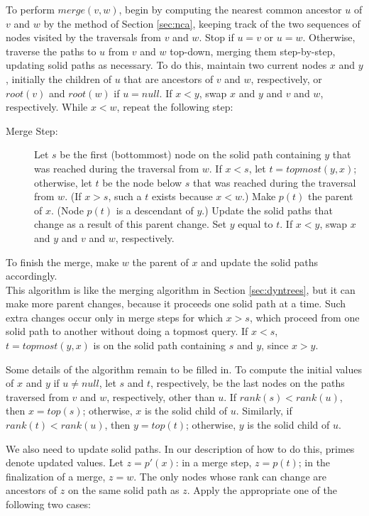 \documentclass[twoside,leqno,twocolumn]{article}
\newcommand{\rank}{\mathit{rank}}
\newcommand{\merge}{\mathit{merge}}
\newcommand{\topn}{\mathit{top}}
\newcommand{\nul}{\mathit{null}}
\newcommand{\rootn}{\mathit{root}}
\begin{document}
To perform $\merge(v, w)$, begin by computing the nearest common ancestor $u$ of $v$ and $w$ by the method of Section \ref{sec:nca}, keeping track of the two sequences of nodes visited by the traversals from $v$ and $w$. Stop if $u=v$ or $u=w$. Otherwise, traverse the paths to $u$ from $v$ and $w$ top-down, merging them step-by-step, updating solid paths as necessary. To do this, maintain two current nodes $x$ and $y$, initially the children of $u$ that are ancestors of $v$ and $w$, respectively, or $\rootn(v)$ and $\rootn(w)$ if $u = \nul$.  If $x < y$, swap $x$ and $y$ and $v$ and $w$, respectively.  While $x < w$, repeat the following step:
\begin{description}
\item[Merge Step:] Let $s$ be the first (bottommost) node on the solid path containing $y$ that was reached during the traversal from $w$.  If $x < s$, let $t = \mathit{topmost}(y, x)$; otherwise, let $t$ be the node below $s$ that was reached during the traversal from $w$.  (If $x > s$, such a $t$ exists because $x < w$.)  Make $p(t)$ the parent of $x$. (Node $p(t)$ is a descendant of $y$.)  Update the solid paths that change as a result of this parent change.  Set $y$ equal to $t$.  If $x < y$, swap $x$ and $y$ and $v$ and $w$, respectively.
\end{description}
To finish the merge, make $w$ the parent of $x$ and update the solid paths accordingly.\\


This algorithm is like the merging algorithm in Section \ref{sec:dyntrees}, but it can make more parent changes, because it proceeds one solid path at a time.  Such extra changes occur only in merge steps for which $x > s$, which proceed from one solid path to another without doing a topmost query.  If $x < s$, $t = \mathit{topmost}(y, x)$ is on the solid path containing $s$ and $y$, since $x > y$.

Some details of the algorithm remain to be filled in.  To compute the initial values of $x$ and $y$ if $u \neq \nul$, let $s$ and $t$, respectively, be the last nodes on the paths traversed from $v$ and $w$, respectively, other than $u$. If $\rank(s) < \rank(u)$, then $x = \topn(s)$; otherwise, $x$ is the solid child of $u$.  Similarly, if $\rank(t) < \rank(u)$, then $y = \topn(t)$; otherwise, $y$ is the solid child of $u$.


We also need to update solid paths.  In our description of how to do this, primes denote updated values.  Let $z = p'(x)$: in a merge step, $z = p(t)$; in the finalization of a merge, $z = w$.  The only nodes whose rank can change are ancestors of $z$ on the same solid path as $z$.  Apply the appropriate one of the following two cases:
\end{document}
